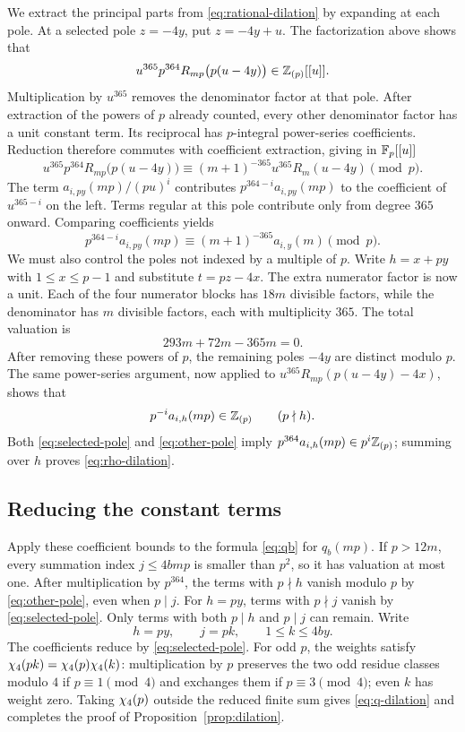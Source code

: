 We extract the principal parts from \eqref{eq:rational-dilation} by
expanding at each pole. At a selected pole $z=-4y$, put $z=-4y+u$.
The factorization above shows that
\begin{equation}\label{eq:local-integral-series}
 u^{365}p^{364}R_{mp}\bigl(p(u-4y)\bigr)\in\mathbb Z_{(p)}[[u]].
\end{equation}
Multiplication by $u^{365}$ removes the denominator factor at that pole.
After extraction of the powers of $p$ already counted, every other
denominator factor has a unit constant term. Its reciprocal has
$p$-integral power-series coefficients. Reduction therefore commutes
with coefficient extraction, giving in $\mathbb F_p[[u]]$
\[
 u^{365}p^{364}R_{mp}\bigl(p(u-4y)\bigr)
 \equiv(m+1)^{-365}u^{365}R_m(u-4y)\pmod p.
\]
The term $a_{i,py}(mp)/(pu)^i$ contributes
$p^{364-i}a_{i,py}(mp)$ to the coefficient of $u^{365-i}$ on the left.
Terms regular at this pole contribute only from degree $365$ onward.
Comparing coefficients yields
\begin{equation}\label{eq:selected-pole}
 p^{364-i}a_{i,py}(mp)\equiv(m+1)^{-365}a_{i,y}(m)\pmod p.
\end{equation}
We must also control the poles not indexed by a multiple of $p$.
Write $h=x+py$ with $1\leq x\leq p-1$ and substitute $t=pz-4x$.
The extra numerator factor is now a unit. Each of the four numerator
blocks has $18m$ divisible factors, while the denominator has $m$
divisible factors, each with multiplicity $365$. The total valuation is
\[
 293m+72m-365m=0.
\]
After removing these powers of $p$, the remaining poles $-4y$ are
distinct modulo $p$.
The same power-series argument, now applied to
$u^{365}R_{mp}(p(u-4y)-4x)$, shows that
\begin{equation}\label{eq:other-pole}
 p^{-i}a_{i,h}(mp)\in\mathbb Z_{(p)}\qquad(p\nmid h).
\end{equation}
Both \eqref{eq:selected-pole} and \eqref{eq:other-pole} imply
$p^{364}a_{i,h}(mp)\in p^i\mathbb Z_{(p)}$; summing over $h$ proves
\eqref{eq:rho-dilation}.

\subsection{Reducing the constant terms}

Apply these coefficient bounds to the formula \eqref{eq:qb} for
$q_b(mp)$. If $p>12m$, every
summation index $j\leq4bmp$ is smaller than $p^2$, so it has valuation
at most one. After multiplication by $p^{364}$, the terms with $p\nmid h$
vanish modulo $p$ by \eqref{eq:other-pole}, even when $p\mid j$.
For $h=py$, terms with $p\nmid j$ vanish by \eqref{eq:selected-pole}.
Only terms with both $p\mid h$ and $p\mid j$ can remain. Write
\[
 h=py,\qquad j=pk,\qquad 1\leq k\leq4by.
\]
The coefficients reduce by \eqref{eq:selected-pole}. For odd $p$,
the weights satisfy $\chi_4(pk)=\chi_4(p)\chi_4(k)$: multiplication by $p$
preserves the two odd residue classes modulo $4$ if $p\equiv1\pmod4$
and exchanges them if $p\equiv3\pmod4$; even $k$ has weight zero.
Taking $\chi_4(p)$ outside the reduced finite sum gives
\eqref{eq:q-dilation} and completes the proof of
Proposition~\ref{prop:dilation}.
